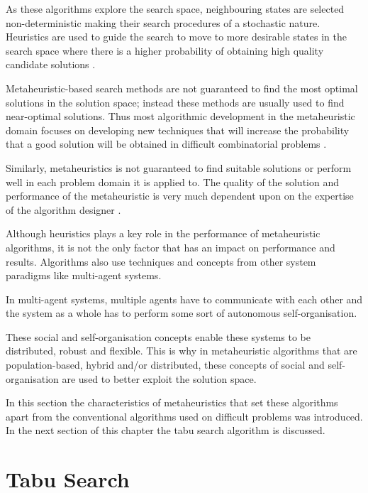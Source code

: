 As these algorithms explore the search space, neighbouring states are selected non-deterministic making their search procedures of a stochastic nature\cite{HandbookofMH, NatureInspiredMetaHeuristic}. Heuristics are used to guide the search to move to more desirable states in the search space where there is a higher probability of obtaining high quality candidate solutions \cite{TabuMontemanniSmith,SweepMeta}.

Metaheuristic-based search methods are not guaranteed to find the most optimal solutions in the solution space; instead these methods are usually used to find near-optimal solutions. Thus most algorithmic development in the metaheuristic domain focuses on developing new techniques that will increase the probability that a good solution will be obtained in difficult combinatorial problems \cite{MetaAgricultural}.

Similarly, metaheuristics is not guaranteed to find suitable solutions or perform well in each problem domain it is applied to. The quality of the solution and performance of the metaheuristic is very much dependent upon on the expertise of the algorithm designer \cite{AutoComplexMeta}. 

Although heuristics plays a key role in the performance of metaheuristic algorithms, it is not the only factor that has an impact on performance and results. Algorithms also use techniques and concepts from other system paradigms like multi-agent systems\cite{Self-AdaptiveMeta}. 

In multi-agent systems, multiple agents have to communicate with each other and the system as a whole has to perform some sort of autonomous self-organisation\cite{Self-AdaptiveMeta}.

These social and self-organisation concepts enable these systems to be distributed, robust and flexible. This is why in metaheuristic algorithms that are population-based, hybrid and/or distributed, these concepts of social and self-organisation  are used to better exploit the solution space\cite{Self-AdaptiveMeta}.

In this section the characteristics of metaheuristics that set these algorithms apart from the conventional algorithms used on difficult problems was introduced. In the next section of this chapter the tabu search algorithm is discussed.
\section{Tabu Search}
\label{sec:tabusearch}
